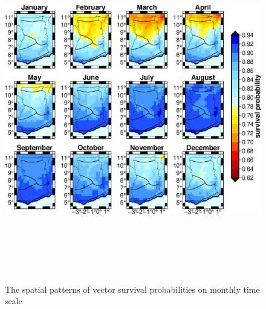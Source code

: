 \documentclass[utf8]{FrontiersinHarvard} %
\begin{document}
\begin{figure}[ht]
\begin{center}
\includegraphics[width=15cm,height=15cm]{survp_era5.eps}
\caption{The spatial patterns of vector survival probabilities on monthly time scale}
\label{fig:3:1}
\end{center}
\end{figure}
\end{document}
